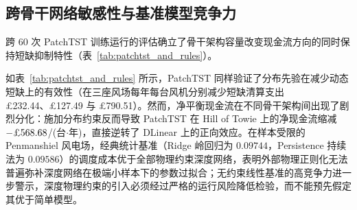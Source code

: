 \subsection{跨骨干网络敏感性与基准模型竞争力}
跨 60 次 PatchTST \cite{nie2023patchtst} 训练运行的评估确立了骨干架构容量改变现金流方向的同时保持短缺抑制特性（表~\ref{tab:patchtst_and_rules}）。



如表~\ref{tab:patchtst_and_rules} 所示，PatchTST 同样验证了分布先验在减少动态短缺上的有效性（在三座风场每年每台风机分别减少短缺清算支出 \pounds 232.44、\pounds 127.49 与 \pounds 790.51）。然而，净平衡现金流在不同骨干架构间出现了剧烈分化：施加分布约束反而导致 PatchTST 在 Hill of Towie 上的净现金流缩减 $-\text{\pounds} 568.68$/(台$\cdot$年)，直接逆转了 DLinear 上的正向效应。在样本受限的 Penmanshiel 风电场，经典统计基准（Ridge 岭回归为 $0.09744$，Persistence 持续法为 $0.09586$）的调度成本优于全部物理约束深度网络，表明外部物理正则化无法普遍弥补深度网络在极端小样本下的参数过拟合；无约束线性基准的高竞争力进一步警示，深度物理约束的引入必须经过严格的运行风险降低检验，而不能预先假定其优于简单模型。
